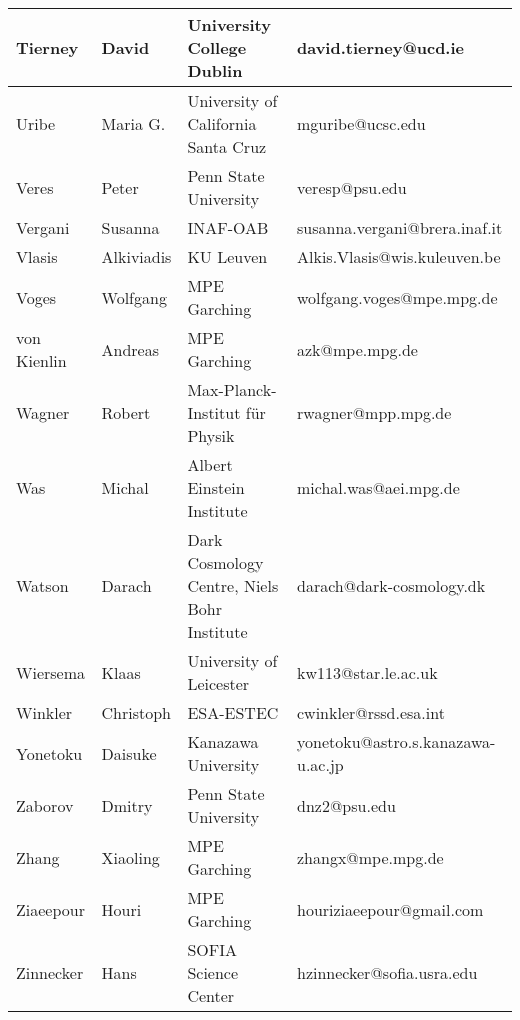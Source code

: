 \begin{center}
\begin{longtable}{|p{1.28cm} |p{1.28cm} |p{2.9cm} |p{3cm} |}
\tiny Tierney &\tiny David & \tiny University College Dublin & \tiny david.tierney@ucd.ie \\ \hline
\tiny Uribe &\tiny Maria G. & \tiny University of California Santa Cruz & \tiny mguribe@ucsc.edu \\ \hline
\tiny Veres &\tiny Peter & \tiny Penn State University & \tiny veresp@psu.edu \\ \hline
\tiny Vergani &\tiny Susanna & \tiny INAF-OAB & \tiny susanna.vergani@brera.inaf.it \\ \hline
\tiny Vlasis &\tiny Alkiviadis & \tiny KU Leuven & \tiny Alkis.Vlasis@wis.kuleuven.be \\ \hline
\tiny Voges &\tiny Wolfgang & \tiny MPE Garching & \tiny wolfgang.voges@mpe.mpg.de \\ \hline
\tiny von Kienlin &\tiny Andreas & \tiny MPE Garching & \tiny azk@mpe.mpg.de \\ \hline
\tiny Wagner &\tiny Robert & \tiny Max-Planck-Institut f\"ur Physik & \tiny rwagner@mpp.mpg.de \\ \hline
\tiny Was &\tiny Michal & \tiny Albert Einstein Institute & \tiny michal.was@aei.mpg.de \\ \hline
\tiny Watson &\tiny Darach & \tiny Dark Cosmology Centre, Niels Bohr Institute & \tiny darach@dark-cosmology.dk \\ \hline
\tiny Wiersema &\tiny Klaas & \tiny University of Leicester & \tiny kw113@star.le.ac.uk \\ \hline
\tiny Winkler &\tiny Christoph & \tiny ESA-ESTEC & \tiny cwinkler@rssd.esa.int \\ \hline
\tiny Yonetoku &\tiny Daisuke & \tiny Kanazawa University & \tiny yonetoku@astro.s.kanazawa-u.ac.jp \\ \hline
\tiny Zaborov &\tiny Dmitry & \tiny Penn State University & \tiny dnz2@psu.edu \\ \hline
\tiny Zhang &\tiny Xiaoling & \tiny MPE Garching & \tiny zhangx@mpe.mpg.de \\ \hline
\tiny Ziaeepour &\tiny Houri & \tiny MPE Garching & \tiny houriziaeepour@gmail.com \\ \hline
\tiny Zinnecker &\tiny Hans & \tiny SOFIA Science Center & \tiny hzinnecker@sofia.usra.edu \\ \hline
    \hline
  \end{longtable}
\end{center}
